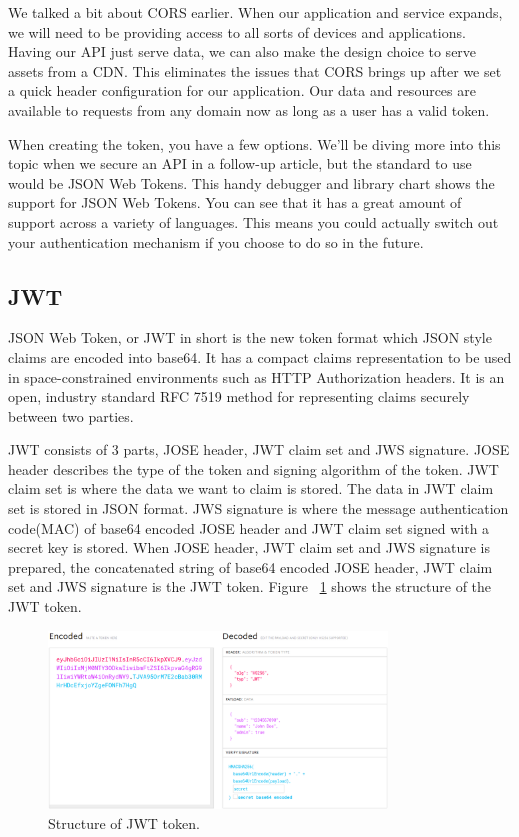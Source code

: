 \documentclass[journal,article,submit,moreauthors,pdftex,10pt,a4paper]{mdpi}
\begin{document}
We talked a bit about CORS earlier. When our application and service expands, we will need to be providing access to all sorts of devices and applications. Having our API just serve data, we can also make the design choice to serve assets from a CDN. This eliminates the issues that CORS brings up after we set a quick header configuration for our application. Our data and resources are available to requests from any domain now as long as a user has a valid token.

When creating the token, you have a few options. We’ll be diving more into this topic when we secure an API in a follow-up article, but the standard to use would be JSON Web Tokens. This handy debugger and library chart shows the support for JSON Web Tokens. You can see that it has a great amount of support across a variety of languages. This means you could actually switch out your authentication mechanism if you choose to do so in the future.

\subsection{JWT}
JSON Web Token, or JWT in short is the new token format which JSON style claims are encoded into base64. It has a compact claims representation to be used in space-constrained environments such as HTTP Authorization headers. It is an open, industry standard RFC 7519 method for representing claims securely between two parties.

JWT consists of 3 parts, JOSE header, JWT claim set and JWS signature. JOSE header describes the type of the token and signing algorithm of the token. JWT claim set is where the data we want to claim is stored. The data in JWT claim set is stored in JSON format. JWS signature is where the message authentication code(MAC) of base64 encoded JOSE header and JWT claim set signed with a secret key is stored. When JOSE header, JWT claim set and JWS signature is prepared, the concatenated string of base64 encoded JOSE header, JWT claim set and JWS signature is the JWT token. Figure ~\ref{structure} shows the structure of the JWT token.

\begin{figure}[H]
    \centering
    \includegraphics[width=9cm]{figures/jwt_structure}
    \caption{Structure of JWT token. }
    \label{structure}
\end{figure}
\end{document}

